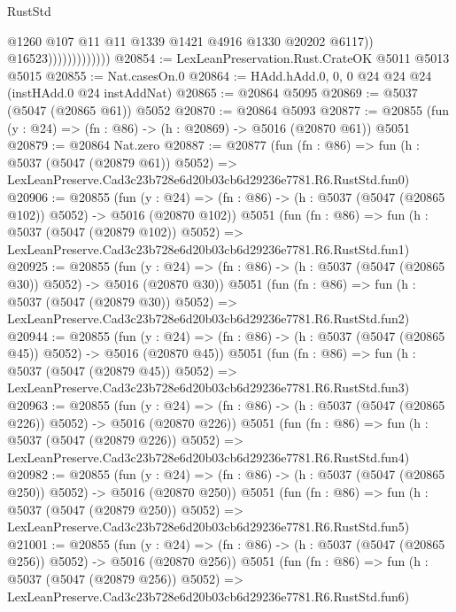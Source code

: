 \begin{lexlean}{RustStd}
\begin{coremodule}
                                  @1260
                                  @107
                                  @11
                                  @11
                                  @1339
                                  @1421
                                  @4916
                                  @1330
                                  @20202
                                  @6117))
                              @16523)))))))))))))
@20854 := LexLeanPreservation.Rust.CrateOK @5011 @5013 @5015
@20855 := Nat.casesOn.{0}
@20864 := HAdd.hAdd.{0, 0, 0} @24 @24 @24 (instHAdd.{0} @24 instAddNat)
@20865 := @20864 @5095
@20869 := @5037 (@5047 (@20865 @61)) @5052
@20870 := @20864 @5093
@20877 := @20855 (fun (y : @24) => (fn : @86) -> (h : @20869) -> @5016 (@20870 @61)) @5051
@20879 := @20864 Nat.zero
@20887 := @20877
    (fun (fn : @86) =>
    fun (h : @5037 (@5047 (@20879 @61)) @5052) =>
    LexLeanPreserve.Cad3c23b728e6d20b03cb6d29236e7781.R6.RustStd.fun0)
@20906 := @20855
    (fun (y : @24) => (fn : @86) -> (h : @5037 (@5047 (@20865 @102)) @5052) -> @5016 (@20870 @102))
    @5051
    (fun (fn : @86) =>
    fun (h : @5037 (@5047 (@20879 @102)) @5052) =>
    LexLeanPreserve.Cad3c23b728e6d20b03cb6d29236e7781.R6.RustStd.fun1)
@20925 := @20855
    (fun (y : @24) => (fn : @86) -> (h : @5037 (@5047 (@20865 @30)) @5052) -> @5016 (@20870 @30))
    @5051
    (fun (fn : @86) =>
    fun (h : @5037 (@5047 (@20879 @30)) @5052) =>
    LexLeanPreserve.Cad3c23b728e6d20b03cb6d29236e7781.R6.RustStd.fun2)
@20944 := @20855
    (fun (y : @24) => (fn : @86) -> (h : @5037 (@5047 (@20865 @45)) @5052) -> @5016 (@20870 @45))
    @5051
    (fun (fn : @86) =>
    fun (h : @5037 (@5047 (@20879 @45)) @5052) =>
    LexLeanPreserve.Cad3c23b728e6d20b03cb6d29236e7781.R6.RustStd.fun3)
@20963 := @20855
    (fun (y : @24) => (fn : @86) -> (h : @5037 (@5047 (@20865 @226)) @5052) -> @5016 (@20870 @226))
    @5051
    (fun (fn : @86) =>
    fun (h : @5037 (@5047 (@20879 @226)) @5052) =>
    LexLeanPreserve.Cad3c23b728e6d20b03cb6d29236e7781.R6.RustStd.fun4)
@20982 := @20855
    (fun (y : @24) => (fn : @86) -> (h : @5037 (@5047 (@20865 @250)) @5052) -> @5016 (@20870 @250))
    @5051
    (fun (fn : @86) =>
    fun (h : @5037 (@5047 (@20879 @250)) @5052) =>
    LexLeanPreserve.Cad3c23b728e6d20b03cb6d29236e7781.R6.RustStd.fun5)
@21001 := @20855
    (fun (y : @24) => (fn : @86) -> (h : @5037 (@5047 (@20865 @256)) @5052) -> @5016 (@20870 @256))
    @5051
    (fun (fn : @86) =>
    fun (h : @5037 (@5047 (@20879 @256)) @5052) =>
    LexLeanPreserve.Cad3c23b728e6d20b03cb6d29236e7781.R6.RustStd.fun6)

\end{coremodule}
\end{lexlean}
